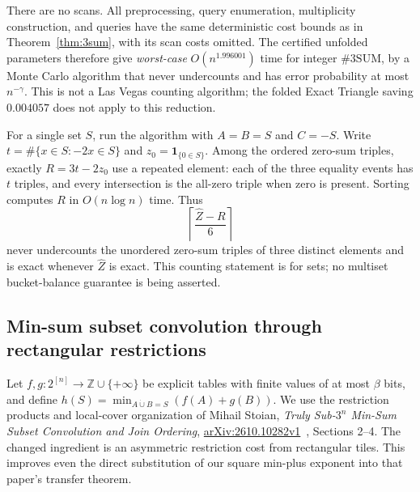 \documentclass[11pt]{article}
\begin{document}
There are no scans. All preprocessing, query enumeration, multiplicity
construction, and queries have the same deterministic cost bounds as in
Theorem~\ref{thm:3sum}, with its scan costs omitted. The certified unfolded
parameters therefore give \emph{worst-case} $O(n^{1.996001})$ time for
integer $\#3\mathrm{SUM}$, by a Monte Carlo algorithm that never undercounts
and has error probability at most $n^{-\gamma}$. This is not a Las Vegas
counting algorithm; the folded Exact Triangle saving $0.004057$ does not
apply to this reduction.

For a single set $S$, run the algorithm with $A=B=S$ and $C=-S$. Write
$t=\#\{x\in S:-2x\in S\}$ and $z_0=\mathbf1_{\{0\in S\}}$. Among the ordered
zero-sum triples, exactly $R=3t-2z_0$ use a repeated element: each of the
three equality events has $t$ triples, and every intersection is the
all-zero triple when zero is present. Sorting computes $R$ in
$O(n\log n)$ time. Thus
\[
\left\lceil\frac{\widehat Z-R}{6}\right\rceil
\]
never undercounts the unordered zero-sum triples of three distinct elements
and is exact whenever $\widehat Z$ is exact. This counting statement is for
sets; no multiset bucket-balance guarantee is being asserted.

\subsection*{Min-sum subset convolution through rectangular restrictions}
Let $f,g:2^{[n]}\to\mathbb Z\cup\{+\infty\}$ be explicit tables with
finite values of at most $\beta$ bits, and define
$h(S)=\min_{A\mathbin{\dot\cup}B=S}(f(A)+g(B))$.
We use the restriction products and local-cover organization of Mihail
Stoian, \emph{Truly Sub-$3^n$ Min-Sum Subset Convolution and Join Ordering},
\href{https://arxiv.org/html/2610.10282v1}{arXiv:2610.10282v1}~\cite{S26},
Sections 2--4. The changed ingredient is an asymmetric restriction cost
from rectangular tiles. This improves even the direct substitution of our
square min-plus exponent into that paper's transfer theorem.
\end{document}
